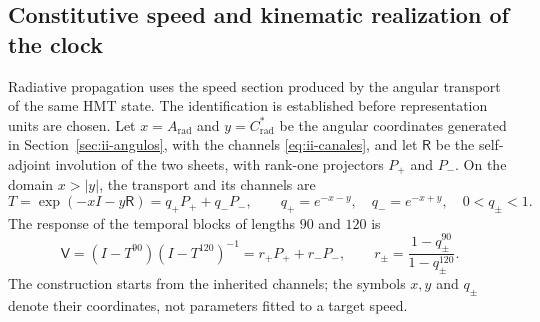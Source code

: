 \subsection{Constitutive speed and kinematic realization of the clock}
\label{v:sec:enlace-velocidad-constitutiva}

Radiative propagation uses the speed section produced by the
angular transport of the same HMT state. The identification is established
before representation units are chosen. Let $x=A_{\mathrm{rad}}$ and
$y=C^*_{\mathrm{rad}}$ be the angular coordinates generated in
Section~\ref{sec:ii-angulos}, with the channels
\eqref{eq:ii-canales}, and let
$\mathsf R$ be the self-adjoint involution of the two sheets, with rank-one
projectors $P_+$ and $P_-$. On the domain $x>|y|$, the transport and its
channels are
\begin{equation}
 T=\exp(-xI-y\mathsf R)=q_+P_++q_-P_-,
 \qquad q_+=e^{-x-y},\quad q_-=e^{-x+y},\quad 0<q_\pm<1.
 \label{v:eq:velocidad-transporte}
\end{equation}
The response of the temporal blocks of lengths $90$ and $120$ is
\begin{equation}
 \mathsf V=(I-T^{90})(I-T^{120})^{-1}
       =r_+P_++r_-P_-,\qquad
 r_\pm=\frac{1-q_\pm^{90}}{1-q_\pm^{120}}.
 \label{v:eq:velocidad-respuesta}
\end{equation}
The construction starts from the inherited channels; the symbols $x,y$ and
$q_\pm$ denote their coordinates, not parameters fitted to a target
speed.

